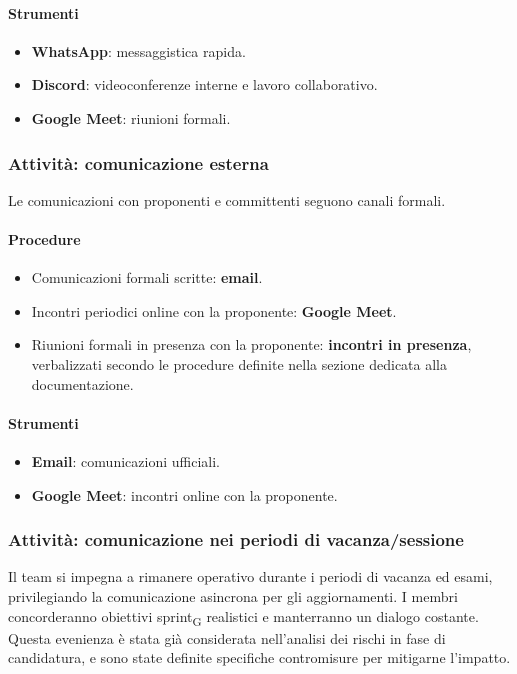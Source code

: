 \documentclass[11pt,a4paper]{article}
\newcommand{\gls}[1]{#1\textsubscript{G}}
\begin{document}
\paragraph{Strumenti}
\begin{itemize}
    \item \textbf{WhatsApp}: messaggistica rapida.
    \item \textbf{Discord}: videoconferenze interne e lavoro collaborativo.
    \item \textbf{Google Meet}: riunioni formali.
\end{itemize}

\subsubsection{Attività: comunicazione esterna}
Le comunicazioni con proponenti e committenti seguono canali formali.

\paragraph{Procedure}
\begin{itemize}
    \item Comunicazioni formali scritte: \textbf{email}.
    \item Incontri periodici online con la proponente: \textbf{Google Meet}.
    \item Riunioni formali in presenza con la proponente: \textbf{incontri
    in presenza}, verbalizzati secondo le procedure definite nella sezione
    dedicata alla documentazione.
\end{itemize}

\paragraph{Strumenti}
\begin{itemize}
    \item \textbf{Email}: comunicazioni ufficiali.
    \item \textbf{Google Meet}: incontri online con la proponente.
\end{itemize}

\subsubsection{Attività: comunicazione nei periodi di vacanza/sessione}
Il team si impegna a rimanere operativo durante i periodi di vacanza ed esami, privilegiando la comunicazione asincrona per gli aggiornamenti. I membri concorderanno obiettivi \gls{sprint} realistici e manterranno un dialogo costante.
Questa evenienza è stata già considerata nell'analisi dei rischi in fase di
candidatura, e sono state definite specifiche contromisure per mitigarne l'impatto.
\end{document}

